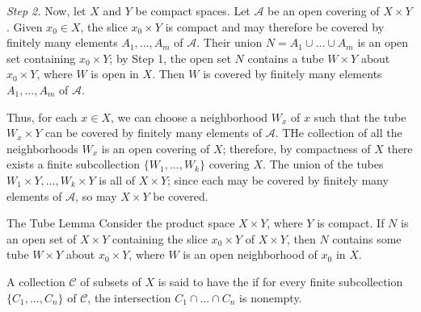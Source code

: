 \documentclass[12pt, a4paper, twoside, openright, titlepage]{book}
\begin{document}
\begin{proof*}{}{}
    \emph{Step 2.} Now, let $X$ and $Y$ be compact spaces. Let $\mathcal{A}$ be an open covering of $X\times Y$. Given $x_0 \in X$, the slice $x_0 \times Y$ is compact and may therefore be covered by finitely many elements $A_1,...,A_m$ of $\mathcal{A}$. Their union $N = A_1 \cup ... \cup A_m$ is an open set containing $x_0 \times Y$; by Step 1, the open set $N$ contains a tube $W\times Y$ about $x_0 \times Y$, where $W$ is open in $X$. Then $W$ is covered by finitely many elements $A_1,...,A_m$ of $\mathcal{A}$. 

    Thus, for each $x \in X$, we can choose a neighborhood $W_x$ of $x$ such that the tube $W_x \times Y$ can be covered by finitely many elements of $\mathcal{A}$. THe collection of all the neighborhoods $W_x$ is an open covering of $X$; therefore, by compactness of $X$ there exists a finite subcollection $\{W_1,...,W_k\}$ covering $X$. The union of the tubes $W_1\times Y,..., W_k\times Y$ is all of $X \times Y$; since each may be covered by finitely many elements of $\mathcal{A}$, so may $X\times Y$ be covered.
\end{proof*}

\begin{lem}{The Tube Lemma}{}
    Consider the product space $X\times Y$, where $Y$ is compact. If $N$ is an open set of $X\times Y$ containing the slice $x_0 \times Y$ of $X\times Y$, then $N$ contains some tube $W\times Y$ about $x_0 \times Y$, where $W$ is an open neighborhood of $x_0$ in $X$.
\end{lem}

\begin{defn}{}{}
    A collection $\mathcal{C}$ of subsets of $X$ is said to have the  if for every finite subcollection $\{C_1,...,C_n\}$ of $\mathcal{C}$, the intersection $C_1\cap ...\cap C_n$ is nonempty.
\end{defn}
\end{document}
